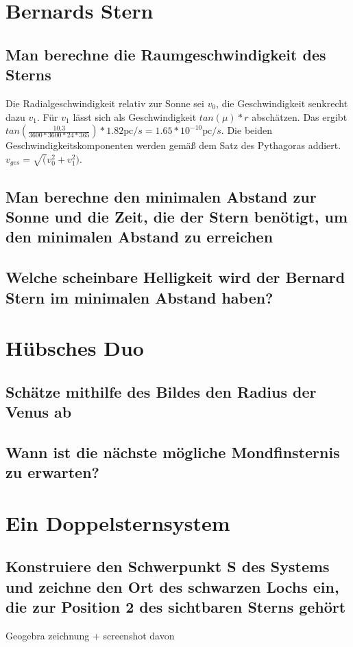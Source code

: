 \documentclass[12pt]{article}
\newcommand{\pc}{\mathrm{pc}}
\begin{document}
	\setcounter{section}{5}
	\section{Bernards Stern}
	\subsection{Man berechne die Raumgeschwindigkeit des Sterns}
	Die Radialgeschwindigkeit relativ zur Sonne sei $v_0$, die Geschwindigkeit senkrecht dazu $v_1$.
	Für $v_1$ lässt sich als Geschwindigkeit $tan(\mu)*r$ abschätzen. Das ergibt $tan(\frac{10.3}{3600*3600*24*365})*1.82 \pc/s=1.65*10^{-10} \pc/s$.
	Die beiden Geschwindigkeitskomponenten werden gemäß dem Satz des Pythagoras addiert. $v_{ges}=\sqrt(v_0^2+v_1^2)$.
	\subsection{Man berechne den minimalen Abstand zur Sonne und die Zeit, die der Stern benötigt, um den minimalen Abstand zu erreichen}
	
	\subsection{Welche scheinbare Helligkeit wird der Bernard Stern im minimalen Abstand haben?}
	
	\section{Hübsches Duo}
	\subsection{Schätze mithilfe des Bildes den Radius der Venus ab}
	
	\subsection{Wann ist die nächste mögliche Mondfinsternis zu erwarten?}
	
	\section{Ein Doppelsternsystem}
	\subsection{Konstruiere den Schwerpunkt S des Systems und zeichne den Ort des schwarzen Lochs ein, die zur Position 2 des sichtbaren Sterns gehört}
	Geogebra zeichnung + screenshot davon
	
\end{document}
